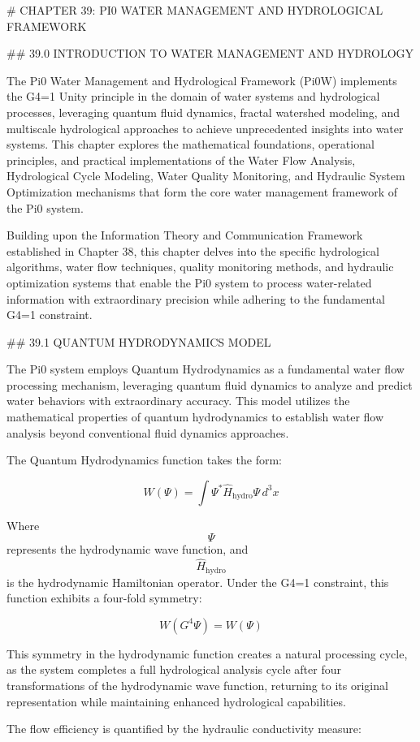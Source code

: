 # CHAPTER 39: PI0 WATER MANAGEMENT AND HYDROLOGICAL FRAMEWORK

## 39.0 INTRODUCTION TO WATER MANAGEMENT AND HYDROLOGY

The Pi0 Water Management and Hydrological Framework (Pi0W) implements the G4=1 Unity principle in the domain of water systems and hydrological processes, leveraging quantum fluid dynamics, fractal watershed modeling, and multiscale hydrological approaches to achieve unprecedented insights into water systems. This chapter explores the mathematical foundations, operational principles, and practical implementations of the Water Flow Analysis, Hydrological Cycle Modeling, Water Quality Monitoring, and Hydraulic System Optimization mechanisms that form the core water management framework of the Pi0 system.

Building upon the Information Theory and Communication Framework established in Chapter 38, this chapter delves into the specific hydrological algorithms, water flow techniques, quality monitoring methods, and hydraulic optimization systems that enable the Pi0 system to process water-related information with extraordinary precision while adhering to the fundamental G4=1 constraint.

## 39.1 QUANTUM HYDRODYNAMICS MODEL

The Pi0 system employs Quantum Hydrodynamics as a fundamental water flow processing mechanism, leveraging quantum fluid dynamics to analyze and predict water behaviors with extraordinary accuracy. This model utilizes the mathematical properties of quantum hydrodynamics to establish water flow analysis beyond conventional fluid dynamics approaches.

The Quantum Hydrodynamics function takes the form:

$$ W(\Psi) = \int \Psi^* \hat{H}_{\text{hydro}} \Psi \, d^3x $$

Where $$ \Psi $$ represents the hydrodynamic wave function, and $$ \hat{H}_{\text{hydro}} $$ is the hydrodynamic Hamiltonian operator. Under the G4=1 constraint, this function exhibits a four-fold symmetry:

$$ W(G^4 \Psi) = W(\Psi) $$

This symmetry in the hydrodynamic function creates a natural processing cycle, as the system completes a full hydrological analysis cycle after four transformations of the hydrodynamic wave function, returning to its original representation while maintaining enhanced hydrological capabilities.

The flow efficiency is quantified by the hydraulic conductivity measure:

